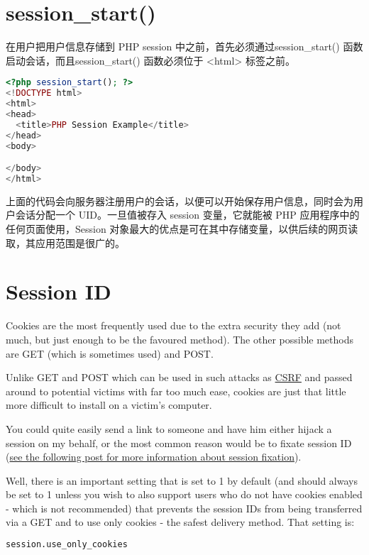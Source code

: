 \section{session\_start()}


在用户把用户信息存储到 PHP session 中之前，首先必须通过session\_start() 函数启动会话，而且session\_start() 函数必须位于 <html> 标签之前。

\begin{lstlisting}[language=PHP]
<?php session_start(); ?>
<!DOCTYPE html>
<html>
<head>
  <title>PHP Session Example</title>
</head>
<body>

</body>
</html>
\end{lstlisting}

上面的代码会向服务器注册用户的会话，以便可以开始保存用户信息，同时会为用户会话分配一个 UID。一旦值被存入 session 变量，它就能被 PHP 应用程序中的任何页面使用，Session 对象最大的优点是可在其中存储变量，以供后续的网页读取，其应用范围是很广的。



\section{Session ID}


Cookies are the most frequently used due to the extra security they add (not much, but just enough to be the favoured method). The other possible methods are GET (which is sometimes used) and POST.

Unlike GET and POST which can be used in such attacks as \href{http://www.talkphp.com/advanced-php-programming/1063-cross-site-request-forgeries.html}{CSRF} and passed around to potential victims with far too much ease, cookies are just that little more difficult to install on a victim's computer.

You could quite easily send a link to someone and have him either hijack a session on my behalf, or the most common reason would be to fixate session ID (\href{http://www.talkphp.com/tips-tricks/1024-tips-php-security-post1813.html#post1813}{see the following post for more information about session fixation}).

Well, there is an important setting that is set to 1 by default (and should always be set to 1 unless you wish to also support users who do not have cookies enabled - which is not recommended) that prevents the session IDs from being transferred via a GET and to use only cookies - the safest delivery method. That setting is:

\begin{lstlisting}[language=bash]
session.use_only_cookies
\end{lstlisting}


